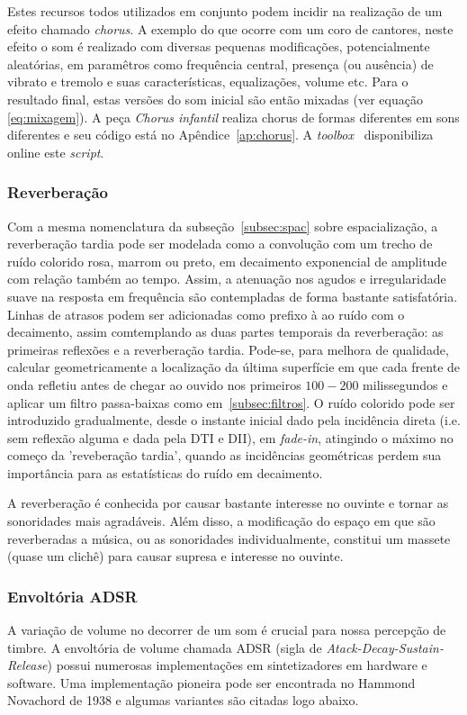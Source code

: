 Estes recursos todos utilizados em conjunto podem incidir na realização de um efeito chamado \emph{chorus}. A
exemplo do que ocorre com um coro de cantores, neste efeito o som é realizado com diversas pequenas modificações,
potencialmente aleatórias, em paramêtros como frequência central, presença (ou ausência) de vibrato
e tremolo e suas características, equalizações, volume etc. Para o resultado final, estas versões do som
inicial são então mixadas (ver equação \ref{eq:mixagem}). A peça \emph{Chorus infantil} realiza chorus de formas
diferentes em sons diferentes e seu código está no Apêndice~\ref{ap:chorus}. A \emph{toolbox} \massa\ disponibiliza online este \emph{script}.

\subsubsection{Reverberação}\label{subsubsec:reverb}
Com a mesma nomenclatura da subseção~\ref{subsec:spac} sobre espacialização, a reverberação tardia pode ser modelada como a convolução com um trecho de ruído colorido rosa, marrom ou preto, em decaimento exponencial de amplitude com relação também ao tempo. Assim, a atenuação nos agudos e irregularidade suave na resposta em frequência são contempladas de forma bastante satisfatória.\cite{JOSPhy,guillaume} Linhas de atrasos podem ser adicionadas como prefixo à ao ruído com o decaimento, assim comtemplando as duas partes temporais da reverberação: as primeiras reflexões e a reverberação tardia. Pode-se, para melhora de qualidade, calcular geometricamente a localização da última superfície em que cada frente de onda refletiu antes de chegar ao ouvido nos primeiros $100-200$ milissegundos e aplicar um filtro passa-baixas como em~\ref{subsec:filtros}. O ruído colorido pode ser introduzido gradualmente, desde o instante inicial dado pela incidência direta (i.e. sem reflexão alguma e dada pela DTI e DII), em \emph{fade-in}, atingindo o máximo no começo da 'reveberação tardia', quando as incidências geométricas perdem sua importância para as estatísticas do ruído em decaimento.

A reverberação é conhecida por causar bastante interesse no ouvinte e tornar as sonoridades mais agradáveis. Além disso, a modificação do espaço em que são reverberadas a música, ou as sonoridades individualmente, constitui um massete (quase um clichê) para causar supresa e interesse no ouvinte. 



\subsubsection{Envoltória ADSR}
A variação de volume no decorrer de um som é crucial para nossa percepção de timbre. A envoltória de volume chamada ADSR (sigla de \emph{Atack-Decay-Sustain-Release}) possui numerosas implementações em sintetizadores em hardware e software. Uma implementação pioneira pode ser encontrada no Hammond Novachord de 1938 e algumas variantes são citadas logo abaixo.\cite{ADSR}

